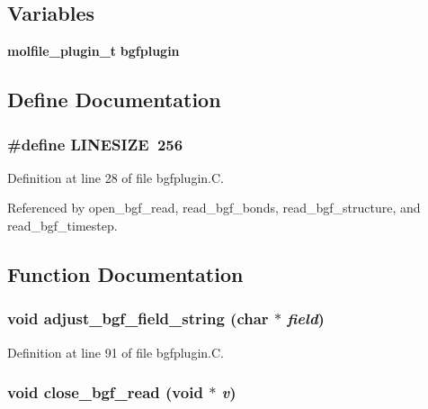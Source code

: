 \subsection*{Variables}
\begin{CompactItemize}
\item 
{\bf molfile\_\-plugin\_\-t} {\bf bgfplugin}
\end{CompactItemize}


\subsection{Define Documentation}
\subsubsection{\setlength{\rightskip}{0pt plus 5cm}\#define LINESIZE\ 256}\label{bgfplugin_8C_a0}




Definition at line 28 of file bgfplugin.C.

Referenced by open\_\-bgf\_\-read, read\_\-bgf\_\-bonds, read\_\-bgf\_\-structure, and read\_\-bgf\_\-timestep.

\subsection{Function Documentation}
\subsubsection{\setlength{\rightskip}{0pt plus 5cm}void adjust\_\-bgf\_\-field\_\-string (char $\ast$ {\em field})\hspace{0.3cm}{\tt  [static]}}\label{bgfplugin_8C_a3}




Definition at line 91 of file bgfplugin.C.
\subsubsection{\setlength{\rightskip}{0pt plus 5cm}void close\_\-bgf\_\-read (void $\ast$ {\em v})\hspace{0.3cm}{\tt  [static]}}\label{bgfplugin_8C_a17}




